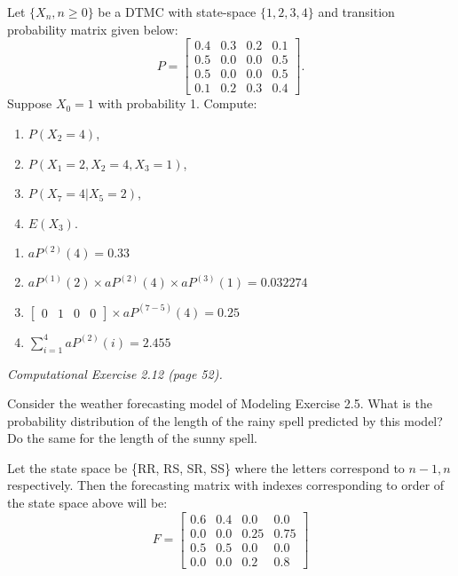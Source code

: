 \documentclass[answers]{exam}
\begin{document}
\begin{questions}
Let \(\{X_n,n\geq0\}\) be a DTMC with state-space \(\{1,2,3,4\}\) and transition probability matrix given below:
\[P=\begin{bmatrix}
	0.4 & 0.3 & 0.2 & 0.1 \\
	0.5 & 0.0 & 0.0 & 0.5 \\
	0.5 & 0.0 & 0.0 & 0.5 \\ 
	0.1 & 0.2 & 0.3 & 0.4
\end{bmatrix}.\]
Suppose \(X_0 = 1\) with probability 1. Compute:
\begin{enumerate}[1.]
	\item \(P(X_2 = 4)\),
	\item \(P(X_1 = 2, X_2 = 4, X_3 = 1)\), 
	\item \(P(X_7 = 4|X_5 = 2)\),
	\item \(E(X_3)\).
\end{enumerate}
\begin{solution}
	\begin{enumerate}[1.]
		\item \(aP^{(2)}(4)  =  0.33\)
		\item \(aP^{(1)}(2) \times aP^{(2)}(4) \times aP^{(3)}(1)  =  0.032274\)
		\item \(\begin{bmatrix} 0 & 1 & 0 & 0 \end{bmatrix} \times aP^{(7-5)}(4)  =  0.25\)
		\item \(\sum_{i=1}^{4}aP^{(2)}(i) = 2.455\)
	\end{enumerate}
\end{solution}

\question 
\textit{Computational Exercise 2.12 (page 52).}

Consider the weather forecasting model of Modeling Exercise 2.5. 
What is the probability distribution of the length of the rainy 
spell predicted by this model? Do the same for the length of the sunny spell.

\begin{solution}
	Let the state space be \{RR, RS, SR, SS\} 
	where the letters correspond to \(n-1,n\) respectively.
	Then the forecasting matrix with indexes corresponding to
	order of the state space above will be:
	\[F= \begin{bmatrix}
		0.6 & 0.4 & 0.0 & 0.0 \\
		0.0 & 0.0 & 0.25 & 0.75 \\
		0.5 & 0.5 & 0.0 & 0.0 \\
		0.0 & 0.0 & 0.2 & 0.8 
	\end{bmatrix}\]
	

\end{solution}
\end{questions}
\end{document}
